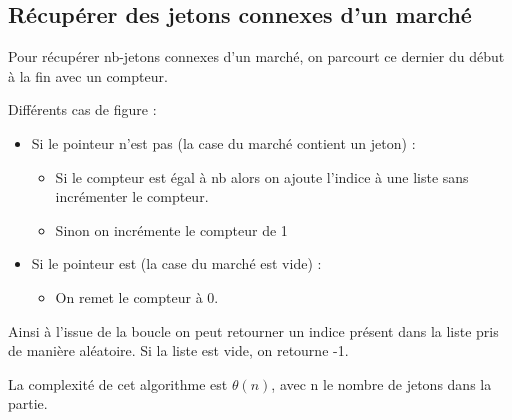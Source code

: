 \subsection{Récupérer des jetons connexes d'un marché}
\label{linkedtokens}

Pour récupérer nb-jetons connexes d'un marché, on parcourt ce dernier du début à la fin avec un compteur.

\noindent Différents cas de figure :
\begin{itemize}
    \item Si le pointeur n'est pas  (la case du marché contient un jeton) :
    \begin{itemize}
        \item Si le compteur est égal à nb alors on ajoute l'indice à une liste sans incrémenter le compteur.
        \item Sinon on incrémente le compteur de 1
    \end{itemize}
    \item Si le pointeur est  (la case du marché est vide) :
    \begin{itemize}
        \item On remet le compteur à 0.
    \end{itemize}
\end{itemize}

Ainsi à l'issue de la boucle on peut retourner un indice présent dans la liste pris de manière aléatoire. Si la liste est vide, on retourne -1.

La complexité de cet algorithme est $\theta(n)$, avec n le nombre de jetons dans la partie. 